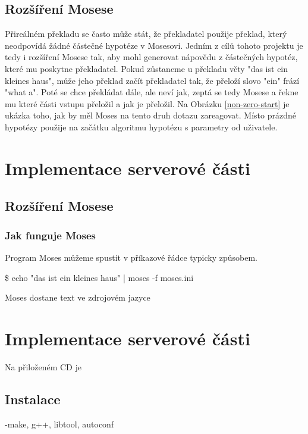 \documentclass[12pt,a4paper]{report}
\def\parcite#1{\cite{#1}}  %
\begin{document}
\section{Rozšíření Mosese}

Přireálném překladu se často může stát, že překladatel použije překlad, který neodpovídá žádné částečné hypotéze v Mosesovi. Jedním z cílů tohoto projektu je tedy i rozšíření Mosese tak, aby mohl generovat nápovědu z částečných hypotéz, které mu poskytne překladatel. Pokud zůstaneme u překladu věty "das ist ein kleines haus", může jeho překlad začít překladatel tak, že přeloží slovo "ein" frází "what a". Poté se chce překládat dále, ale neví jak, zeptá se tedy Mosese a řekne mu které části vstupu přeložil a jak je přeložil. Na Obrázku \ref{non-zero-start} je ukázka toho, jak by měl Moses na tento druh dotazu zareagovat. Místo prázdné hypotézy použije na začátku algoritmu hypotézu s parametry od uživatele.




\chapter{Implementace serverové části}

\section{Rozšíření Mosese}

\subsection{Jak funguje Moses}
Program Moses můžeme spustit v příkazové řádce typicky způsobem.


\$ echo "das ist ein kleines haus" | moses -f moses.ini


Moses dostane text ve zdrojovém jazyce %







\chapter{Implementace serverové části}

Na přiloženém CD je  

\section{Instalace}
-make, g++, libtool, autoconf
\end{document}
